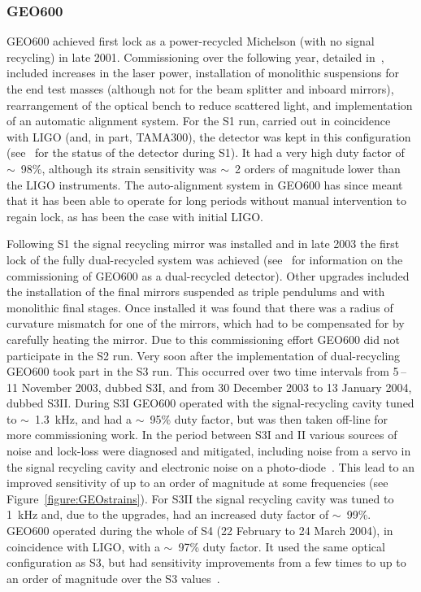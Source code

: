 \subsubsection{GEO600}

GEO600 achieved first lock as a power-recycled Michelson (with no signal recycling) in late 2001. 
Commissioning over the following year, detailed in~\cite{Hewitson:2003}, included increases in the laser
power, installation of monolithic suspensions for the end test masses (although not for the beam splitter and 
inboard mirrors), rearrangement of the optical bench to reduce scattered light, and implementation of an 
automatic alignment system. For the S1 run, carried out in coincidence with LIGO (and, in part, TAMA300), the
detector was kept in this configuration (see~\cite{Abbott:2004a} for the status of the detector during S1). 
It had a very high duty factor of $\sim$~98\%, although its strain sensitivity was $\sim$~2 orders of
magnitude lower than the LIGO instruments. The auto-alignment system in GEO600 has since meant that it has 
been able to operate for long periods without manual intervention to regain lock, as has been the
case with initial LIGO.

Following S1 the signal recycling mirror was installed and in late 2003 the first lock of the fully 
dual-recycled system was achieved (see~\cite{Smith:2004, Willke:2004, Grote:2005} for information on the
commissioning of GEO600 as a dual-recycled detector). Other upgrades included the installation of the final 
mirrors suspended as triple pendulums and with monolithic final stages. Once installed it was found that 
there was a radius of curvature mismatch for one of the mirrors, which had to be compensated for by
carefully heating the mirror. Due to this commissioning effort GEO600 did not participate in the S2 run. Very 
soon after the implementation of dual-recycling GEO600 took part in the S3 run. This occurred over two time 
intervals from 5\,--\,11 November 2003, dubbed S3I, and from 30 December 2003 to 13 January 2004,
dubbed S3II. During S3I GEO600 operated with the signal-recycling cavity tuned to $\sim$~1.3~kHz, and had a 
$\sim$~95\% duty factor, but was then taken off-line for more commissioning work. In the period between S3I 
and II various sources of noise and lock-loss were diagnosed and mitigated, including noise from a servo in 
the signal recycling cavity and electronic noise on a photo-diode~\cite{Smith:2004}. This lead to an improved 
sensitivity of up to an order of magnitude at some frequencies (see Figure~\ref{figure:GEOstrains}). For
S3II the signal recycling cavity was tuned to 1~kHz and, due to the upgrades, had an increased duty factor of 
$\sim$~99\%. GEO600 operated during the whole of S4 (22 February to 24 March 2004), in coincidence with LIGO, 
with a $\sim$~97\% duty factor. It used the same optical configuration as S3, but had sensitivity
improvements from a few times to up to an order of magnitude over the S3 values~\cite{Hild:2006a}.

